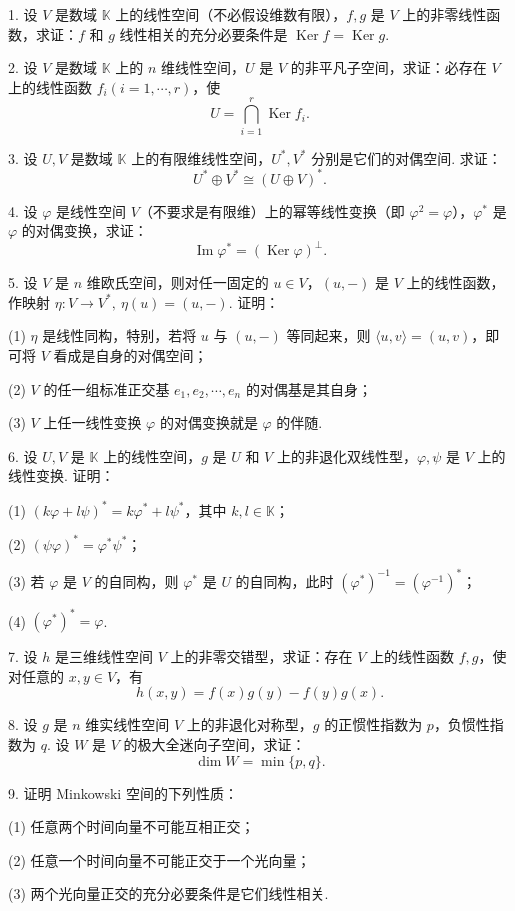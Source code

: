\documentclass[UTF8, 12pt, fontset=fandol, oneside]{ctexart}
\begin{document}
1. 设 $V$ 是数域 $\mathbb K$ 上的线性空间（不必假设维数有限），$f,g$ 是 $V$ 上的非零线性函数，求证：$f$ 和 $g$ 线性相关的充分必要条件是 $\operatorname{Ker} f=\operatorname{Ker} g$.

2. 设 $V$ 是数域 $\mathbb K$ 上的 $n$ 维线性空间，$U$ 是 $V$ 的非平凡子空间，求证：必存在 $V$ 上的线性函数 $f_i(i=1,\cdots,r)$，使
\[
  U=\bigcap_{i=1}^r \operatorname{Ker} f_i.
\]

3. 设 $U,V$ 是数域 $\mathbb K$ 上的有限维线性空间，$U^*,V^*$ 分别是它们的对偶空间. 求证：
\[
  U^*\oplus V^*\cong (U\oplus V)^*.
\]

4. 设 $\varphi$ 是线性空间 $V$（不要求是有限维）上的幂等线性变换（即 $\varphi^2=\varphi$），$\varphi^*$ 是 $\varphi$ 的对偶变换，求证：
\[
  \operatorname{Im}\varphi^*=(\operatorname{Ker}\varphi)^\perp.
\]

5. 设 $V$ 是 $n$ 维欧氏空间，则对任一固定的 $u\in V$，$(u,-)$ 是 $V$ 上的线性函数，作映射 $\eta:V\to V^*,\ \eta(u)=(u,-)$. 证明：

(1) $\eta$ 是线性同构，特别，若将 $u$ 与 $(u,-)$ 等同起来，则 $\langle u,v\rangle=(u,v)$，即可将 $V$ 看成是自身的对偶空间；

(2) $V$ 的任一组标准正交基 $e_1,e_2,\cdots,e_n$ 的对偶基是其自身；

(3) $V$ 上任一线性变换 $\varphi$ 的对偶变换就是 $\varphi$ 的伴随.

6. 设 $U,V$ 是 $\mathbb K$ 上的线性空间，$g$ 是 $U$ 和 $V$ 上的非退化双线性型，$\varphi,\psi$ 是 $V$ 上的线性变换. 证明：

(1) $(k\varphi+l\psi)^*=k\varphi^*+l\psi^*$，其中 $k,l\in\mathbb K$；

(2) $(\psi\varphi)^*=\varphi^*\psi^*$；

(3) 若 $\varphi$ 是 $V$ 的自同构，则 $\varphi^*$ 是 $U$ 的自同构，此时 $(\varphi^*)^{-1}=(\varphi^{-1})^*$；

(4) $(\varphi^*)^*=\varphi$.

7. 设 $h$ 是三维线性空间 $V$ 上的非零交错型，求证：存在 $V$ 上的线性函数 $f,g$，使对任意的 $x,y\in V$，有
\[
  h(x,y)=f(x)g(y)-f(y)g(x).
\]

8. 设 $g$ 是 $n$ 维实线性空间 $V$ 上的非退化对称型，$g$ 的正惯性指数为 $p$，负惯性指数为 $q$. 设 $W$ 是 $V$ 的极大全迷向子空间，求证：
\[
  \dim W=\min\{p,q\}.
\]

9. 证明 Minkowski 空间的下列性质：

(1) 任意两个时间向量不可能互相正交；

(2) 任意一个时间向量不可能正交于一个光向量；

(3) 两个光向量正交的充分必要条件是它们线性相关.
\end{document}
